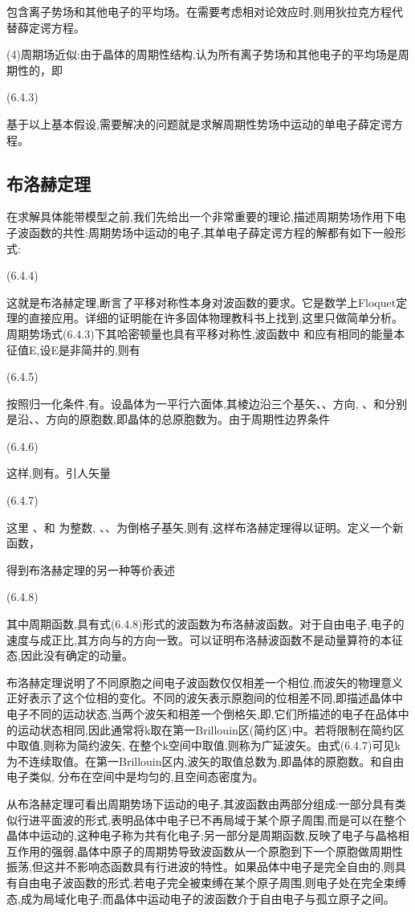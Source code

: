 包含离子势场和其他电子的平均场。在需要考虑相对论效应时,则用狄拉克方程代替薛定谔方程。

(4)周期场近似:由于晶体的周期性结构,认为所有离子势场和其他电子的平均场是周期性的，即

 	(6.4.3)

基于以上基本假设,需要解决的问题就是求解周期性势场中运动的单电子薛定谔方程。

\subsection{布洛赫定理}

在求解具体能带模型之前,我们先给出一个非常重要的理论,描述周期势场作用下电子波函数的共性:周期势场中运动的电子,其单电子薛定谔方程的解都有如下一般形式:

 	(6.4.4)

这就是布洛赫定理,断言了平移对称性本身对波函数的要求。它是数学上Floquet定理的直接应用。详细的证明能在许多固体物理教科书上找到,这里只做简单分析。周期势场式(6.4.3)下其哈密顿量也具有平移对称性,波函数中 和应有相同的能量本征值E,设E是非简并的,则有

 	(6.4.5)

按照归一化条件,有。设晶体为一平行六面体,其棱边沿三个基矢、、方向, 、和分别是沿、、方向的原胞数,即晶体的总原胞数为。由于周期性边界条件

	 (6.4.6)

这样,则有。引人矢量

 	(6.4.7)

这里 、和 为整数, 、、为倒格子基矢,则有,这样布洛赫定理得以证明。定义一个新函数，



得到布洛赫定理的另一种等价表述

 	(6.4.8)

其中周期函数,具有式(6.4.8)形式的波函数为布洛赫波函数。对于自由电子,电子的速度与成正比,其方向与的方向一致。可以证明布洛赫波函数不是动量算符的本征态,因此没有确定的动量。

布洛赫定理说明了不同原胞之间电子波函数仅仅相差一个相位,而波矢的物理意义正好表示了这个位相的变化。不同的波矢表示原胞间的位相差不同,即描述晶体中电子不同的运动状态,当两个波矢和相差一个倒格矢,即,它们所描述的电子在品体中的运动状态相同,因此通常将k取在第一Brillouin区(简约区)中。若将限制在简约区中取值,则称为简约波矢, 在整个k空间中取值,则称为广延波矢。由式(6.4.7)可见k为不连续取值。在第一Brillouin区内,波矢的取值总数为,即晶体的原胞数。和自由电子类似, 分布在空间中是均匀的,且空间态密度为。

从布洛赫定理可看出周期势场下运动的电子,其波函数由两部分组成:一部分具有类似行进平面波的形式,表明品体中电子已不再局域于某个原子周围,而是可以在整个晶体中运动的,这种电子称为共有化电子;另一部分是周期函数,反映了电子与晶格相互作用的强弱,晶体中原子的周期势导致波函数从一个原胞到下一个原胞做周期性振荡,但这并不影响态函数具有行进波的特性。如果品体中电子是完全自由的,则具有自由电子波函数的形式;若电子完全被束缚在某个原子周围,则电子处在完全束缚态,成为局域化电子;而晶体中运动电子的波函数介于自由电子与孤立原子之间。

